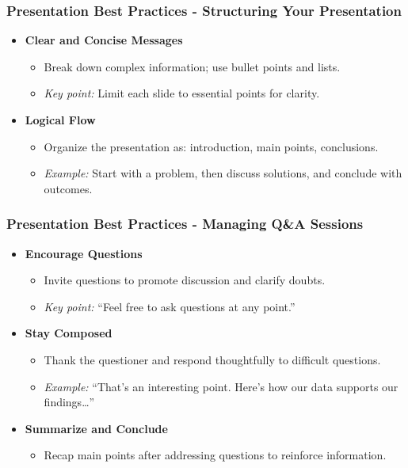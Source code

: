 \documentclass{beamer}
\begin{document}
\begin{frame}[fragile]
    \frametitle{Presentation Best Practices - Structuring Your Presentation}
    \begin{itemize}
        \item \textbf{Clear and Concise Messages}
        \begin{itemize}
            \item Break down complex information; use bullet points and lists.
            \item \textit{Key point:} Limit each slide to essential points for clarity.
        \end{itemize}
        
        \item \textbf{Logical Flow}
        \begin{itemize}
            \item Organize the presentation as: introduction, main points, conclusions.
            \item \textit{Example:} Start with a problem, then discuss solutions, and conclude with outcomes.
        \end{itemize}
    \end{itemize}
\end{frame}

\begin{frame}[fragile]
    \frametitle{Presentation Best Practices - Managing Q\&A Sessions}
    \begin{itemize}
        \item \textbf{Encourage Questions}
        \begin{itemize}
            \item Invite questions to promote discussion and clarify doubts.
            \item \textit{Key point:} “Feel free to ask questions at any point.”
        \end{itemize}
        
        \item \textbf{Stay Composed}
        \begin{itemize}
            \item Thank the questioner and respond thoughtfully to difficult questions.
            \item \textit{Example:} “That’s an interesting point. Here’s how our data supports our findings…”
        \end{itemize}
        
        \item \textbf{Summarize and Conclude}
        \begin{itemize}
            \item Recap main points after addressing questions to reinforce information.
        \end{itemize}
    \end{itemize}
\end{frame}
\end{document}
